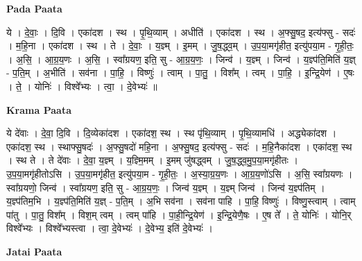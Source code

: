 \documentclass[17pt]{extarticle}
\begin{document}
\textbf{Pada Paata} \newline

ये । दे॒वाः॒ । दि॒वि । एका॑दश । स्थ । पृ॒थि॒व्याम् । अधीति॑ । एका॑दश । स्थ । अ॒फ्सु॒षद॒ इत्य॑फ्सु - सदः॑ । म॒हि॒ना । एका॑दश । स्थ । ते । दे॒वाः॒ । य॒ज्ञ्म् । इ॒मम् । जु॒ष॒द्ध्व॒म् । उ॒प॒या॒मगृ॑हीत॒ इत्यु॑पया॒म - गृ॒ही॒तः॒ । अ॒सि॒ । आ॒ग्र॒य॒णः । अ॒सि॒ । स्वा᳚ग्रयण॒ इति॒ सु - आ॒ग्र॒य॒णः॒ । जिन्व॑ । य॒ज्ञ्म् । जिन्व॑ । य॒ज्ञ्प॑ति॒मिति॑ य॒ज्ञ् - प॒ति॒म् । अ॒भीति॑ । सव॑ना । पा॒हि॒ । विष्णुः॑ । त्वाम् । पा॒तु॒ । विश᳚म् । त्वम् । पा॒हि॒ । इ॒न्द्रि॒येण॑ । ए॒षः । ते॒ । योनिः॑ । विश्वे᳚भ्यः । त्वा॒ । दे॒वेभ्यः॑ ॥  \newline


\textbf{Krama Paata} \newline

ये दे॑वाः । दे॒वा॒ दि॒वि । दि॒व्येका॑दश । एका॑दश॒ स्थ । स्थ पृ॑थि॒व्याम् । पृ॒थि॒व्यामधि॑ । अद्ध्येका॑दश । एका॑दश॒ स्थ । स्थाफ्सु॒षदः॑ । अ॒फ्सु॒षदो॑ महि॒ना । अ॒फ्सु॒षद॒ इत्य॑फ्सु - सदः॑ । म॒हि॒नैका॑दश । एका॑दश॒ स्थ । स्थ ते । ते दे॑वाः । दे॒वा॒ य॒ज्ञ्म् । य॒ज्ञ्मि॒मम् । इ॒मम् जु॑षद्ध्वम् । जु॒ष॒द्ध्व॒मु॒प॒या॒मगृ॑हीतः । उ॒प॒या॒मगृ॑हीतोऽसि । उ॒प॒या॒मगृ॑हीत॒ इत्यु॑पया॒म - गृ॒ही॒तः॒ । अ॒स्या॒ग्र॒य॒णः । आ॒ग्र॒य॒णो॑ऽसि । अ॒सि॒ स्वा᳚ग्रयणः । स्वा᳚ग्रयणो॒ जिन्व॑ । स्वा᳚ग्रयण॒ इति॒ सु - आ॒ग्र॒य॒णः॒ । जिन्व॑ य॒ज्ञ्म् । य॒ज्ञ्म् जिन्व॑ । जिन्व॑ य॒ज्ञ्प॑तिम् । य॒ज्ञ्प॑तिम॒भि । य॒ज्ञ्प॑ति॒मिति॑ य॒ज्ञ् - प॒ति॒म् । अ॒भि सव॑ना । सव॑ना पाहि । पा॒हि॒ विष्णुः॑ । विष्णु॒स्त्वाम् । त्वाम् पा॑तु । पा॒तु॒ विश᳚म् । विश॒म् त्वम् । त्वम् पा॑हि । पा॒ही॒न्द्रि॒येण॑ । इ॒न्द्रि॒येणै॒षः । ए॒ष ते᳚ । ते॒ योनिः॑ । योनि॒र् विश्वे᳚भ्यः । विश्वे᳚भ्यस्त्वा । त्वा॒ दे॒वेभ्यः॑ । दे॒वेभ्य॒ इति॑ दे॒वेभ्यः॑ । \newline

\textbf{Jatai Paata} \newline
\end{document}
